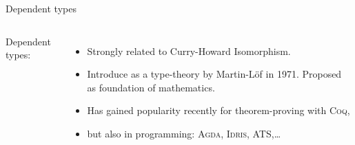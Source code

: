 \documentclass[xcolor=svgnames,11pt]{beamer}
\newcommand{\mysc}[1]{\textsc{#1}\xspace}
\newcommand{\coq}{\textsc{Coq}\xspace}
\newcommand{\agda}{\textsc{Agda}\xspace}
\begin{document}
\begin{frame}{Dependent types}
\begin{columns}
Dependent types:
\begin{itemize}
\item<2-> Strongly related to Curry-Howard Isomorphism.
\item<3-> Introduce as a type-theory by Martin-Löf in 1971. Proposed as foundation of mathematics.
\item<4-> Has gained popularity recently for theorem-proving with \coq,
\item<5-> but also in programming: {\agda}, \mysc{Idris}, \mysc{ATS},\dots
\end{itemize}
\end{columns}
\end{frame}
\end{document}
